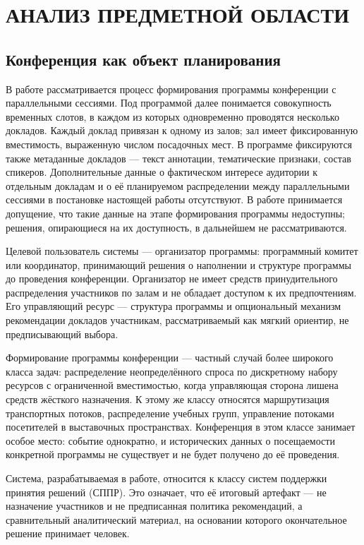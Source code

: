 \chapter{АНАЛИЗ ПРЕДМЕТНОЙ ОБЛАСТИ}
\label{ch:domain}


\section{Конференция как объект планирования}

В работе рассматривается процесс формирования программы конференции с параллельными сессиями. Под программой далее понимается совокупность временных слотов, в каждом из которых одновременно проводятся несколько докладов. Каждый доклад привязан к одному из залов; зал имеет фиксированную вместимость, выраженную числом посадочных мест. В программе фиксируются также метаданные докладов --- текст аннотации, тематические признаки, состав спикеров. Дополнительные данные о фактическом интересе аудитории к отдельным докладам и о её планируемом распределении между параллельными сессиями в постановке настоящей работы отсутствуют. В работе принимается допущение, что такие данные на этапе формирования программы недоступны; решения, опирающиеся на их доступность, в дальнейшем не рассматриваются.

Целевой пользователь системы --- организатор программы: программный комитет или координатор, принимающий решения о наполнении и структуре программы до проведения конференции. Организатор не имеет средств принудительного распределения участников по залам и не обладает доступом к их предпочтениям. Его управляющий ресурс --- структура программы и опциональный механизм рекомендации докладов участникам, рассматриваемый как мягкий ориентир, не предписывающий выбора.

Формирование программы конференции --- частный случай более широкого класса задач: распределение неопределённого спроса по дискретному набору ресурсов с ограниченной вместимостью, когда управляющая сторона лишена средств жёсткого назначения. К этому же классу относятся маршрутизация транспортных потоков, распределение учебных групп, управление потоками посетителей в выставочных пространствах. Конференция в этом классе занимает особое место: событие однократно, и исторических данных о посещаемости конкретной программы не существует и не будет получено до её проведения.

Система, разрабатываемая в работе, относится к классу систем поддержки принятия решений (СППР). Это означает, что её итоговый артефакт --- не назначение участников и не предписанная политика рекомендаций, а сравнительный аналитический материал, на основании которого окончательное решение принимает человек.

